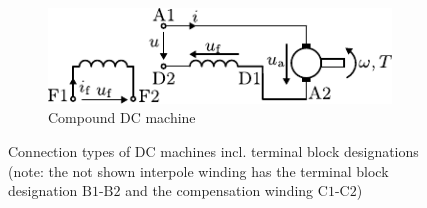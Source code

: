 \begin{frame}
\begin{figure}
		\hfill
		\begin{subfigure}[b]{0.49\textwidth}
			\centering
			\includegraphics[scale=1.2]{fig/lec03/Compound_DC_machine.pdf}
			\caption{Compound DC machine} 
		\end{subfigure}
		\vspace{-0.1cm}
		\caption{Connection types of DC machines incl. terminal block designations (note: the not shown interpole winding has the terminal block designation $\mbox{B}1$-$\mbox{B}2$ and the compensation winding $\mbox{C}1$-$\mbox{C}2$)} 
        \label{fig:connection_types_DC_machines}
	\end{figure}
\end{frame}

